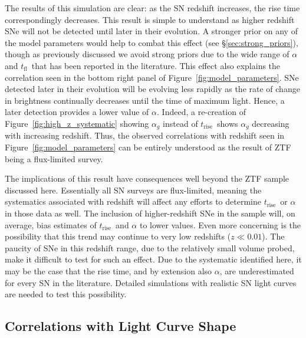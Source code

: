 \documentclass[twocolumn]{./aastex63}
\newcommand{\tfl}{$t_\mathrm{fl}$}
\newcommand{\trise}{$t_\mathrm{rise}$}
\begin{document}
The results of this simulation are clear: as the SN redshift increases, the rise
time correspondingly decreases. This result is simple to understand as higher
redshift SNe will not be detected until later in their evolution. A stronger
prior on any of the model parameters would help to combat this effect (see
\S\ref{sec:strong_priors}), though as previously discussed we avoid strong
priors due to the wide range of $\alpha$ and \tfl\ that has been reported in the
literature. This effect also explains the correlation seen in the bottom right
panel of Figure~\ref{fig:model_parameters}. SNe detected later in their
evolution will be evolving less rapidly as the rate of change in brightness
continually decreases until the time of maximum light. Hence, a later detection
provides a lower value of $\alpha$. Indeed, a re-creation of
Figure~\ref{fig:high_z_systematic} showing $\alpha_g$ instead of \trise\ shows
$\alpha_g$ decreasing with increasing redshift. Thus, the observed correlations
with redshift seen in Figure~\ref{fig:model_parameters} can be entirely
understood as the result of ZTF being a flux-limited survey.

The implications of this result have consequences well beyond the ZTF sample
discussed here. Essentially all SN surveys are flux-limited, meaning the
systematics associated with redshift will affect any efforts to determine
\trise\ or $\alpha$ in those data as well. The inclusion of higher-redshift
SNe in the sample will, on average, bias estimates of \trise\ and $\alpha$ to
lower values. Even more concerning is the possibility that this trend may
continue to very low redshifts ($z \ll 0.01$). The paucity of SNe in this
redshift range, due to the relatively small volume probed, make it difficult
to test for such an effect. Due to the systematic identified here, it may be
the case that the rise time, and by extension also $\alpha$, are
underestimated for every SN in the literature. Detailed simulations with
realistic SN light curves are needed to test this possibility.

\subsection{Correlations with Light Curve Shape}
\end{document}
